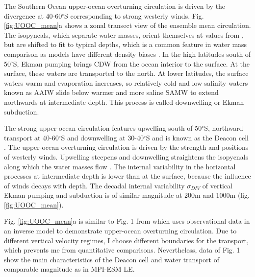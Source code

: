 The Southern Ocean upper-ocean overturning circulation is driven by the divergence at 40-60$^\circ$S corresponding to strong westerly winds. Fig. \ref{fig:UOOC_mean}a shows a zonal transect view of the ensemble mean circulation. 
The isopyncals, which separate water masses, orient themselves at values from \cite{Sallee2013a}, but are shifted to fit to typical depths, which is a common feature in water mass comparison as models have different density biases \citep{Sallee2013a}. 
In the high latitudes south of 50$^\circ$S, Ekman pumping brings \ac{CDW} from the ocean interior to the surface. At the surface, these waters are transported to the north. At lower latitudes, the surface waters warm and evaporation increases, so relatively cold and low salinity waters known as \ac{AAIW} slide below warmer and more saline \ac{SAMW} to extend northwards at intermediate depth. This process is called downwelling or Ekman subduction.  

The strong upper-ocean circulation features upwelling south of 50$^\circ$S, northward transport at 40-60$^\circ$S and downwelling at 30-40$^\circ$S and is known as the Deacon cell \citep{Doeoes1993,Speer2000}. The upper-ocean overturning circulation is driven by the strength and positions of westerly winds. Upwelling steepens and downwelling straightens the isopycnals along which the water masses flow \citep{Marshall2012}. The internal variability in the horizontal processes at intermediate depth is lower than at the surface, because the influence of winds decays with depth. The decadal internal variability $\sigma_{DIV}$ of vertical Ekman pumping and subduction is of similar magnitude at 200m and 1000m (fig. \ref{fig:UOOC_mean}).\newline

Fig. \ref{fig:UOOC_mean}a is similar to Fig. 1 from \cite{DeVries2017} which uses observational data in an inverse model to demonstrate upper-ocean overturning circulation. Due to different vertical velocity regimes, I choose different boundaries for the transport, which prevents me from quantitative comparisons. Nevertheless, data of \cite{DeVries2017} Fig. 1 show the main characteristics of the Deacon cell and water transport of comparable magnitude as in \acs{MPI-ESM LE}. \newline



